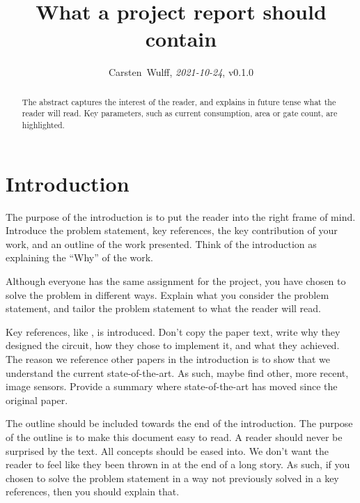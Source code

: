 \documentclass[paper,10pt,a4paper]{IEEEtran}
\begin{document}

\title{What a project report should contain}
\author{Carsten~Wulff, \textit{2021-10-24}, v0.1.0 }
\maketitle

\begin{abstract}
  The abstract captures the interest of the reader, and explains in future tense
  what the reader will read. Key parameters, such as current consumption, area
  or gate count, are highlighted.
\end{abstract}

\section{Introduction}

The purpose of the introduction is to put the reader into the right frame of
mind. Introduce the problem statement, key references, the key contribution of
your work, and an outline of the
work presented. Think of the introduction
as explaining the ``Why'' of the work.

Although everyone has the same assignment for the project, you have chosen to
solve the problem in different ways. Explain what you consider the problem
statement, and tailor the problem statement to what the reader will read.

Key references, like \cite{klein01}, is introduced. Don't copy the paper text, write why they designed the circuit, how they chose to implement it, and
what they achieved. The reason we reference other papers in the introduction is
to show that we understand the current state-of-the-art. As such, maybe find
other, more recent, image sensors. Provide a summary where
state-of-the-art has moved since the original paper.

The outline should be included towards the end of the
introduction. The purpose of the outline is to make this document easy to read. A reader should
never be surprised by the text. All concepts should be eased into. We don't want
the reader to feel like they been thrown in at the end of a long story. As such,
if you chosen to solve the problem statement in a way not previously solved in a
key references, then you should explain that.
\end{document}
